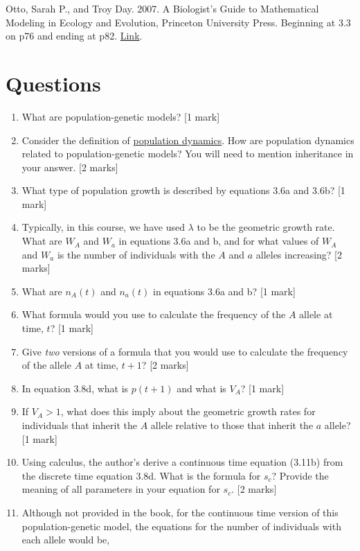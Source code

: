 \documentclass[]{book}
\begin{document}
Otto, Sarah P., and Troy Day. 2007. A Biologist's Guide to Mathematical
Modeling in Ecology and Evolution, Princeton University Press. Beginning
at 3.3 on p76 and ending at p82.
\href{https://ebookcentral-proquest-com.qe2a-proxy.mun.ca/lib/MUN/detail.action?docID=768551}{Link}.

\section{Questions}\label{questions}

\begin{enumerate}
\def\labelenumi{\arabic{enumi}.}
\item
  What are population-genetic models? {[}1 mark{]}
\item
  Consider the definition of
  \href{https://en.wikipedia.org/wiki/Population_dynamics}{population
  dynamics}. How are population dynamics related to population-genetic
  models? You will need to mention inheritance in your answer. {[}2
  marks{]}
\item
  What type of population growth is described by equations 3.6a and
  3.6b? {[}1 mark{]}
\item
  Typically, in this course, we have used \(\lambda\) to be the
  geometric growth rate. What are \(W_A\) and \(W_a\) in equations 3.6a
  and b, and for what values of \(W_A\) and \(W_a\) is the number of
  individuals with the \(A\) and \(a\) alleles increasing? {[}2 marks{]}
\item
  What are \(n_A(t)\) and \(n_a(t)\) in equations 3.6a and b? {[}1
  mark{]}
\item
  What formula would you use to calculate the frequency of the \(A\)
  allele at time, \(t\)? {[}1 mark{]}
\item
  Give \emph{two} versions of a formula that you would use to calculate
  the frequency of the allele \(A\) at time, \(t+1\)? {[}2 marks{]}
\item
  In equation 3.8d, what is \(p(t+1)\) and what is \(V_A\)? {[}1 mark{]}
\item
  If \(V_A > 1\), what does this imply about the geometric growth rates
  for individuals that inherit the \(A\) allele relative to those that
  inherit the \(a\) allele? {[}1 mark{]}
\item
  Using calculus, the author's derive a continuous time equation (3.11b)
  from the discrete time equation 3.8d. What is the formula for \(s_c\)?
  Provide the meaning of all parameters in your equation for \(s_c\).
  {[}2 marks{]}
\item
  Although not provided in the book, for the continuous time version of
  this population-genetic model, the equations for the number of
  individuals with each allele would be,
\end{enumerate}
\end{document}
